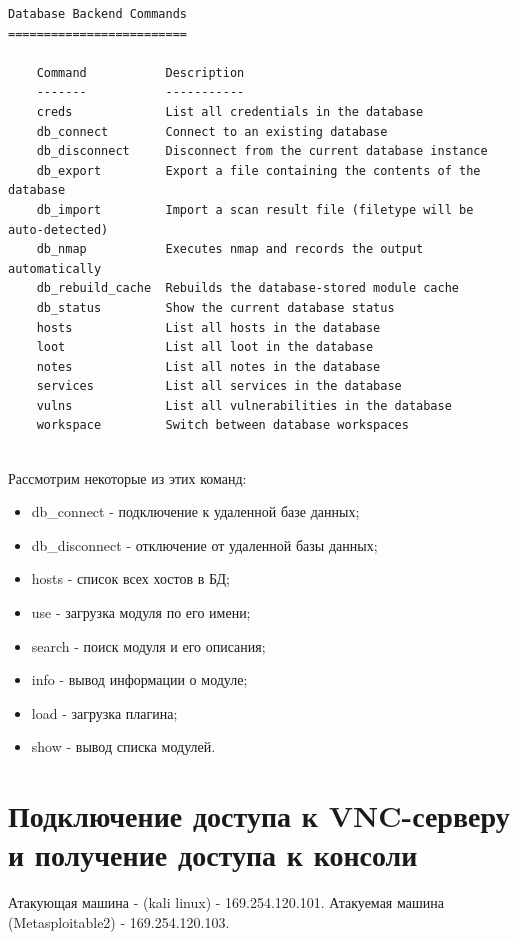 \documentclass[10pt,a4paper]{report}
\begin{document}
\begin{lstlisting}
Database Backend Commands
=========================

    Command           Description
    -------           -----------
    creds             List all credentials in the database
    db_connect        Connect to an existing database
    db_disconnect     Disconnect from the current database instance
    db_export         Export a file containing the contents of the database
    db_import         Import a scan result file (filetype will be auto-detected)
    db_nmap           Executes nmap and records the output automatically
    db_rebuild_cache  Rebuilds the database-stored module cache
    db_status         Show the current database status
    hosts             List all hosts in the database
    loot              List all loot in the database
    notes             List all notes in the database
    services          List all services in the database
    vulns             List all vulnerabilities in the database
    workspace         Switch between database workspaces


		\end{lstlisting}
		
		Рассмотрим некоторые из этих команд:
		\begin{itemize}
			\item db\_connect - подключение к удаленной базе данных;
			\item db\_disconnect - отключение от удаленной базы данных;
			\item hosts - список всех хостов в БД;
			\item use - загрузка модуля по его имени;
			\item search - поиск модуля и его описания;
			\item info - вывод информации о модуле;
			\item load - загрузка плагина;
			\item show - вывод списка модулей.
		\end{itemize}
	
	\section{Подключение доступа к VNC-серверу и получение доступа к консоли}
		Атакующая машина - (kali linux) - 169.254.120.101. Атакуемая машина 
		(Metasploitable2) - 169.254.120.103.
		
\end{document}

